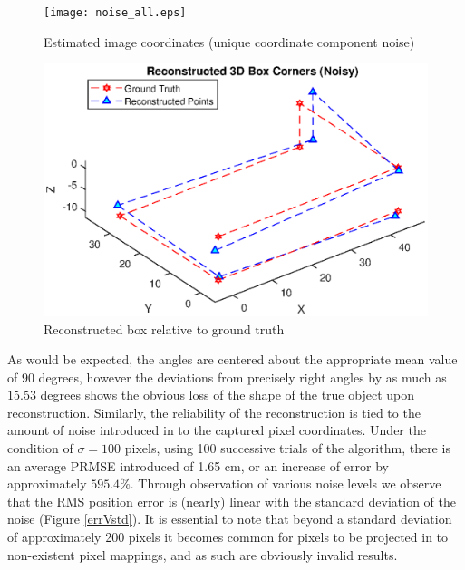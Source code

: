 \documentclass[12pt]{article}
\begin{document}
\begin{figure}[h]
	\centering %
	\captionsetup{justification=centering}
	\begin{minipage}{0.5\textwidth}
		\centering
		\texttt{[image: noise\_all.eps]}
		\caption{Estimated image coordinates \newline(unique coordinate component noise)} \label{noiseall}
	\end{minipage}\hfill
	\begin{minipage}{0.5\textwidth}
		\centering %
		\includegraphics[width=1\textwidth]{noise_all_recon.eps}
		\caption{Reconstructed box relative to ground truth} \label{noiseallrecon}
	\end{minipage}
\end{figure}
As would be expected, the angles are centered about the appropriate mean value of $90$ degrees, however the deviations from precisely right angles by as much as $15.53$ degrees shows the obvious loss of the shape of the true object upon reconstruction. Similarly, the reliability of the reconstruction is tied to the amount of noise introduced in to the captured pixel coordinates. Under the condition of $\sigma = 100$ pixels, using 100 successive trials of the algorithm, there is an average PRMSE introduced of 1.65 cm, or an increase of error by approximately $595.4\%$. Through observation of various noise levels we observe that the RMS position error is (nearly) linear with the standard deviation of the noise (Figure \ref{errVstd}). It is essential to note that beyond a standard deviation of approximately 200 pixels it becomes common for pixels to be projected in to non-existent pixel mappings, and as such are obviously invalid results. 
\end{document}
